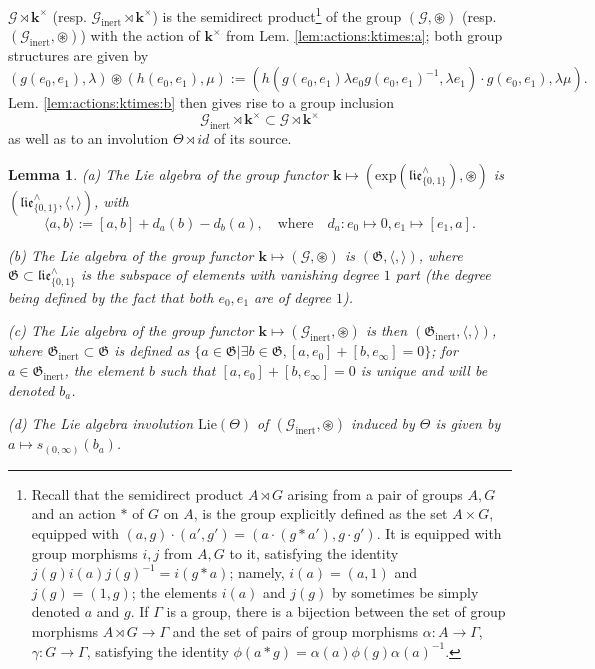 \documentclass[10pt]{amsart}
\newtheorem{lem}[thm]{Lemma}
\numberwithin{equation}{subsection}
\begin{document}
\begin{defn}
   $\mathcal G\rtimes\mathbf k^\times$ (resp. 
   $\mathcal G_{\mathrm{inert}}\rtimes\mathbf k^\times$) is the semidirect 
   product\footnote{
Recall that the semidirect product $A\rtimes G$ arising from a pair of groups $A,G$ and an 
action $*$ of $G$ on $A$, is the group explicitly 
defined as the set $A\times G$, equipped with $(a,g)\cdot (a',g')=(a\cdot (g*a'),g\cdot g')$. 
It is equipped with group morphisms $i,j$ from 
$A,G$ to it, satisfying the identity $j(g)i(a)j(g)^{-1}=i(g*a)$; namely, $i(a)=(a,1)$ and 
$j(g)=(1,g)$; the elements
$i(a)$ and $j(g)$ by sometimes be simply denoted $a$ and $g$. If $\Gamma$ is a group, there 
is a bijection between the set of group morphisms $A\rtimes G\to\Gamma$ and the set of pairs 
of group morphisms 
$\alpha : A\to \Gamma$, $\gamma : G\to \Gamma$, satisfying the identity $\phi(a*g)
=\alpha(a)\phi(g)\alpha(a)^{-1}$.}  
   of the group $(\mathcal G,\circledast)$ (resp. $(\mathcal G_{\mathrm{inert}},\circledast)$)
   with the action of $\mathbf k^\times$ from Lem. \ref{lem:actions:ktimes:a}; both group 
   structures are given by 
$$
(g(e_0,e_1),\lambda)\circledast (h(e_0,e_1),\mu)
:=(h(g(e_0,e_1)\lambda e_0 g(e_0,e_1)^{-1},\lambda e_1)  \cdot g(e_0,e_1),\lambda\mu). 
$$
Lem. \ref{lem:actions:ktimes:b} then gives rise to a group inclusion
   $$
   \mathcal G_{\mathrm{inert}}\rtimes\mathbf k^\times \subset 
\mathcal G\rtimes\mathbf k^\times 
   $$ 
as well as to an involution $\Theta\rtimes id$ of its source.  
\end{defn}


\begin{lem}\label{lem06:1109}
 (a) The Lie algebra of the group functor $\mathbf k\mapsto (\mathrm{exp}(\mathfrak{lie}_{\{0,1\}}^\wedge),\circledast)$ is 
$(\mathfrak{lie}_{\{0,1\}}^\wedge,\langle,\rangle)$, with 
$$
\langle a,b\rangle:=[a,b]+d_a(b)-d_b(a), \quad \textrm{where} \quad d_a : e_0\mapsto 0,e_1\mapsto[e_1,a].  
$$

(b) The Lie algebra of the group functor $\mathbf k\mapsto (\mathcal G,\circledast)$ is 
$(\mathfrak G,\langle,\rangle)$, where 
$\mathfrak G\subset \mathfrak{lie}_{\{0,1\}}^\wedge$ is the subspace of 
elements with vanishing degree $1$ part 
 (the degree being defined by the fact that both $e_0,e_1$ are of degree $1$). 

(c) The Lie algebra of the group functor $\mathbf k\mapsto (\mathcal G_{\mathrm{inert}},\circledast)$ is then 
$(\mathfrak G_{\mathrm{inert}},\langle,\rangle)$, where $\mathfrak G_{\mathrm{inert}}\subset\mathfrak G$ is defined as 
$\{a\in\mathfrak G|\exists b\in\mathfrak G,[a,e_0]+[b,e_\infty]=0\}$; for $a\in \mathfrak G_{\mathrm{inert}}$, 
the element $b$ such that $[a,e_0]+[b,e_\infty]=0$ is unique and will be denoted $b_a$. 

(d) The Lie algebra involution $\mathrm{Lie}(\Theta)$ of $(\mathcal G_{\mathrm{inert}},\circledast)$
induced by $\Theta$ is given by $a\mapsto s_{(0,\infty)}(b_a)$. 
\end{lem}
\end{document}
